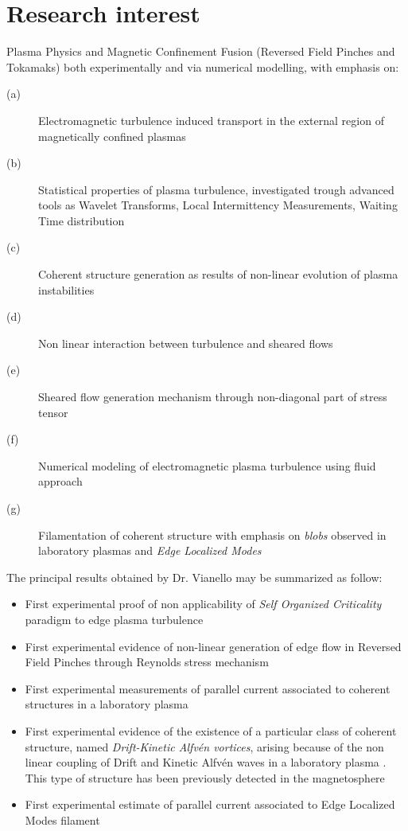 \section{Research interest}
Plasma Physics and Magnetic Confinement Fusion (Reversed Field
Pinches and Tokamaks) both experimentally and via numerical modelling,
with emphasis on:
\begin{description}
\item[(a)] Electromagnetic turbulence induced transport in the
  external region of magnetically confined plasmas
\item[(b)] Statistical properties of plasma turbulence, investigated
  trough advanced tools as Wavelet Transforms, Local Intermittency
  Measurements, Waiting Time distribution
\item[(c)] Coherent structure generation as results of non-linear
  evolution of plasma instabilities
\item[(d)] Non linear interaction between turbulence and sheared flows
\item[(e)] Sheared flow generation mechanism through non-diagonal part
  of stress tensor
\item[(f)] Numerical modeling of electromagnetic plasma turbulence
  using fluid approach
\item[(g)] Filamentation of coherent structure with emphasis on
  \emph{blobs} observed in laboratory plasmas and \emph{Edge Localized
  Modes}
\end{description}
The principal results obtained by Dr. Vianello may be summarized as
follow:
\begin{itemize}
\item First experimental proof of non applicability of \emph{Self
    Organized Criticality} paradigm to edge plasma turbulence \cite{Spada:2001p3574,Antoni:2001p3221}
\item First experimental evidence of non-linear generation of edge
  flow in Reversed Field Pinches through Reynolds stress mechanism \cite{Vianello:2005p1976,Vianello:2005p2671}
\item First experimental measurements of parallel current associated
  to coherent structures in a laboratory plasma \cite{Spolaore:2009p4115}
\item First experimental evidence of the existence of a particular
  class of coherent structure, named \emph{Drift-Kinetic Alfv\'en
    vortices}, arising because of the non linear coupling of Drift and
  Kinetic Alfv\'en waves in a laboratory plasma \cite{Vianello:2010p4670}. This type of structure has been
  previously detected in the magnetosphere
\item First experimental estimate of parallel current associated to
  Edge Localized Modes filament \cite{PhysRevLett.106.125002}
\end{itemize}
